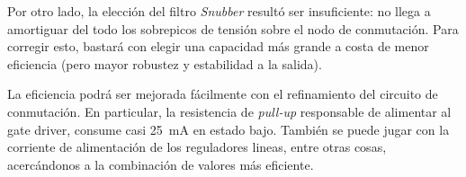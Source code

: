 \documentclass[]{article}
\begin{document}
	Por otro lado, la elección del filtro \textit{Snubber} resultó ser insuficiente: no llega a amortiguar del todo los sobrepicos de tensión sobre el nodo de conmutación. Para corregir esto, bastará con elegir una capacidad más grande a costa de menor eficiencia (pero mayor robustez y estabilidad a la salida).

	La eficiencia podrá ser mejorada fácilmente con el refinamiento del circuito de conmutación. En particular, la resistencia de \textit{pull-up} responsable de alimentar al gate driver, consume casi \SI{25}{mA} en estado bajo. También se puede jugar con la corriente de alimentación de los reguladores lineas, entre otras cosas, acercándonos a la combinación de valores más eficiente.
		
	
	{\footnotesize
		\printbibliography
	}
	\newpage
	\appendix



\let\clearpage\relax


\end{document}
